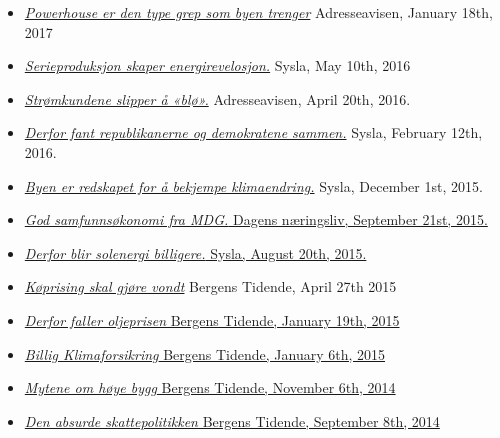 \documentclass[margin]{res}
\begin{document}
\begin{resume}
\begin{itemize}
\item[] \href{http://www.e-pages.dk/adresseavisen/5350/article/525164/33/6/render/?token=d6dbc5eb6e27835a4e2c9e1c460302d6}{\emph{Powerhouse er den type grep som byen trenger}} Adresseavisen, January 18th, 2017

\item[] \href{http://syslagronn.no/2016/05/12/syslagronn/serieproduksjon-skaper-energirevolusjon_87844/.VzQ1IfhgWKc.twitter}{\emph{Serieproduksjon skaper energirevelosjon.}} Sysla, May 10th, 2016

\item[] \href{http://www.e-pages.dk/adresseavisen/5117/article/411985/41/6/render/?token=21b06b63e6a1cbd3e62966cf5706d3ab}{\emph{Str\o mkundene slipper \r{a} «bl\o».}} Adresseavisen, April 20th, 2016.
\item[] \href{http://syslagronn.no/2016/02/12/syslagronn/derfor-fant-republikanerne-og-demokratene-sammen_76977/}{\emph{Derfor fant republikanerne og demokratene sammen.}} Sysla, February 12th, 2016.
\item[] \href{http://www.syslagronn.no/2015/12/01/syslagronn/byen-er-redskapet-for-a-bekjempe-klimaendringer_67934/}{\emph{Byen er redskapet for å bekjempe klimaendring.}} Sysla, December 1st, 2015.
\item[] \href{http://www.dn.no/meninger/2015/09/20/2043/Politikk/god-samfunnskonomi-fra-mdg}{\emph{God samfunnsøkonomi fra MDG.} Dagens n\ae ringsliv, September 21st, 2015.}
\item[] \href{http://www.syslagronn.no/2015/08/20/syslagronn/derfor-blir-solenergi-billigere_51484/}{\emph{Derfor blir solenergi billigere.} Sysla, August 20th, 2015.}
\item[] \href{http://www.e-pages.dk/bergenstidende/1809/article/264899/28/2/render/?token=02cd272aa0579373983f0bf8c4cee611}{ \emph{K\o prising skal gjøre vondt}} Bergens Tidende, April 27th 2015
\item[] \href{http://www.bt.no/meninger/debatt/Derfor-faller-oljeprisen-3282375.html}{ \emph {Derfor faller oljeprisen} Bergens Tidende, January 19th, 2015}
\item[] \href{http://www.e-pages.dk/bergenstidende/1700/article/227941/31/4/render/?token=5207fb9bf5f917b5276532ef05164266}{ \emph {Billig Klimaforsikring} Bergens Tidende, January 6th, 2015}
\item[] \href{http://www.bt.no/meninger/debatt/Mytene-om-hoye-bygg-3234980.html}{ \emph {Mytene om h\o ye bygg} Bergens Tidende, November 6th, 2014}
\item[] \href{http://www.bt.no/meninger/debatt/Den-absurde-skattepolitikken-3191273.html}{\emph{Den absurde skattepolitikken} Bergens Tidende, September 8th, 2014}

\end{itemize}
\end{resume}
\end{document}
